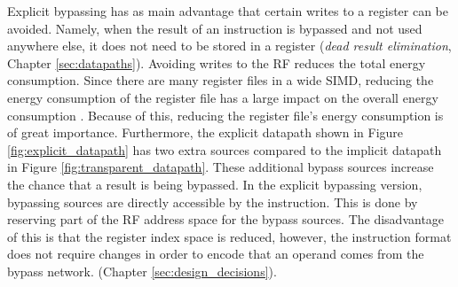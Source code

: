 

Explicit bypassing has as main advantage that certain writes to a register can be avoided. Namely, when the result of an instruction is bypassed and not used anywhere else, it does not need to be stored in a register (\emph{dead result elimination}, Chapter \ref{sec:datapaths}). Avoiding writes to the RF reduces the total energy consumption. Since there are many register files in a wide SIMD, reducing the energy consumption of the register file has a large impact on the overall energy consumption \cite{dongrio1}. Because of this, reducing the register file's energy consumption is of great importance. Furthermore, the explicit datapath shown in Figure \ref{fig:explicit_datapath} has two extra sources compared to the implicit datapath in Figure \ref{fig:transparent_datapath}. These additional bypass sources increase the chance that a result is being bypassed. In the explicit bypassing version, bypassing sources are directly accessible by the instruction. This is done by reserving part of the RF address space for the bypass sources. The disadvantage of this is that the register index space is reduced, however, the instruction format does not require changes in order to encode that an operand comes from the bypass network. (Chapter \ref{sec:design_decisions}). 

